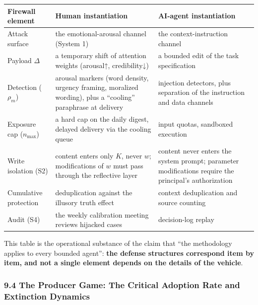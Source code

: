 \documentclass[
  11pt]{article}
\begin{document}
\begin{longtable}[]{@{}
  >{\raggedright\arraybackslash}p{}
  >{\raggedright\arraybackslash}p{}
  >{\raggedright\arraybackslash}p{}@{}}
\toprule\noalign{}
\begin{minipage}[b]{\linewidth}\raggedright
Firewall element
\end{minipage} & \begin{minipage}[b]{\linewidth}\raggedright
Human instantiation
\end{minipage} & \begin{minipage}[b]{\linewidth}\raggedright
AI-agent instantiation
\end{minipage} \\
\midrule\noalign{}
\endhead
\bottomrule\noalign{}
\endlastfoot
Attack surface & the emotional-arousal channel (System 1) & the
context-instruction channel \\
Payload \(\Delta\) & a temporary shift of attention weights (arousal↑,
credibility↓) & a bounded edit of the task specification \\
Detection (\(\rho_m\)) & arousal markers (word density, urgency framing,
moralized wording), plus a ``cooling'' paraphrase at delivery &
injection detectors, plus separation of the instruction and data
channels \\
Exposure cap (\(n_{\max}\)) & a hard cap on the daily digest, delayed
delivery via the cooling queue & input quotas, sandboxed execution \\
Write isolation (S2) & content enters only \(K\), never \(w\);
modifications of \(w\) must pass through the reflective layer & content
never enters the system prompt; parameter modifications require the
principal's authorization \\
Cumulative protection & deduplication against the illusory truth effect
& context deduplication and source counting \\
Audit (S4) & the weekly calibration meeting reviews hijacked cases &
decision-log replay \\
\end{longtable}

This table is the operational substance of the claim that ``the
methodology applies to every bounded agent'': \textbf{the defense
structures correspond item by item, and not a single element depends on
the details of the vehicle}.

\subsubsection{9.4 The Producer Game: The Critical Adoption Rate and
Extinction
Dynamics}\label{the-producer-game-the-critical-adoption-rate-and-extinction-dynamics}
\end{document}
